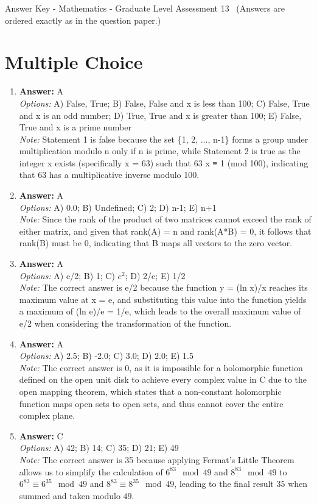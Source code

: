 \documentclass[12pt]{article}
\begin{document}
\begin{center}
Answer Key - Mathematics - Graduate Level Assessment 13 \
\small (Answers are ordered exactly as in the question paper.)
\end{center}

\section*{Multiple Choice}
\begin{enumerate}[label=\arabic*.]
\item \textbf{Answer:} A
\\ \textit{Options:} A) False, True; B) False, False and x is less than 100; C) False, True and x is an odd number; D) True, True and x is greater than 100; E) False, True and x is a prime number
\\ \textit{Note:} Statement 1 is false because the set \{1, 2, ..., n-1\} forms a group under multiplication modulo n only if n is prime, while Statement 2 is true as the integer x exists (specifically x = 63) such that 63 x ≡ 1 (mod 100), indicating that 63 has a multiplicative inverse modulo 100.
\item \textbf{Answer:} A
\\ \textit{Options:} A) 0.0; B) Undefined; C) 2; D) n-1; E) n+1
\\ \textit{Note:} Since the rank of the product of two matrices cannot exceed the rank of either matrix, and given that rank(A) = n and rank(A*B) = 0, it follows that rank(B) must be 0, indicating that B maps all vectors to the zero vector.
\item \textbf{Answer:} A
\\ \textit{Options:} A) e/2; B) 1; C) $e^2$; D) 2/e; E) 1/2
\\ \textit{Note:} The correct answer is e/2 because the function y = (ln x)/x reaches its maximum value at x = e, and substituting this value into the function yields a maximum of (ln e)/e = 1/e, which leads to the overall maximum value of e/2 when considering the transformation of the function.
\item \textbf{Answer:} A
\\ \textit{Options:} A) 2.5; B) -2.0; C) 3.0; D) 2.0; E) 1.5
\\ \textit{Note:} The correct answer is 0, as it is impossible for a holomorphic function defined on the open unit disk to achieve every complex value in C due to the open mapping theorem, which states that a non-constant holomorphic function maps open sets to open sets, and thus cannot cover the entire complex plane.
\item \textbf{Answer:} C
\\ \textit{Options:} A) 42; B) 14; C) 35; D) 21; E) 49
\\ \textit{Note:} The correct answer is 35 because applying Fermat's Little Theorem allows us to simplify the calculation of \(6^{83} \mod 49\) and \(8^{83} \mod 49\) to \(6^{83} \equiv 6^{35} \mod 49\) and \(8^{83} \equiv 8^{35} \mod 49\), leading to the final result \(35\) when summed and taken modulo \(49\).
\end{enumerate}
\end{document}
